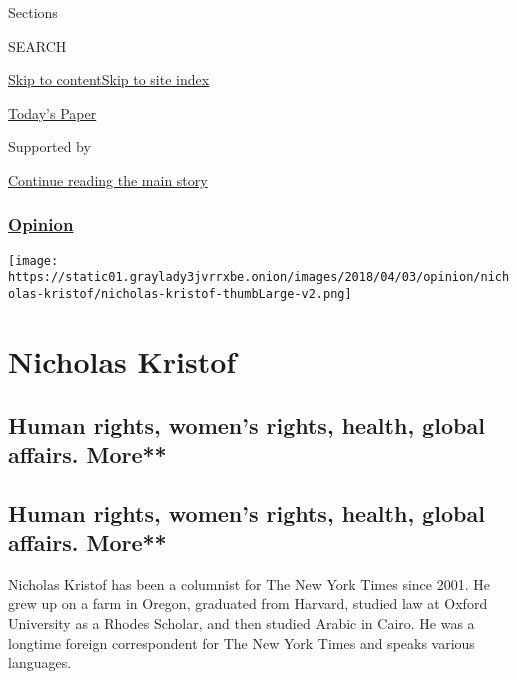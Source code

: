 Sections

SEARCH

\protect\hyperlink{site-content}{Skip to
content}\protect\hyperlink{site-index}{Skip to site index}

\href{https://myaccount.nytimes3xbfgragh.onion/auth/login?response_type=cookie\&client_id=vi}{}

\href{https://www.nytimes3xbfgragh.onion/section/todayspaper}{Today's
Paper}

Supported by

\protect\hyperlink{after-sponsor}{Continue reading the main story}

\hypertarget{opinion}{%
\subsubsection{\texorpdfstring{\href{/section/opinion}{Opinion}}{Opinion}}\label{opinion}}

\texttt{[image: https://static01.graylady3jvrrxbe.onion/images/2018/04/03/opinion/nicholas-kristof/nicholas-kristof-thumbLarge-v2.png]}

\hypertarget{nicholas-kristof}{%
\section{Nicholas Kristof}\label{nicholas-kristof}}

\hypertarget{human-rights-womens-rights-health-global-affairs-more}{%
\subsection{Human rights, women's rights, health, global affairs.
More**}\label{human-rights-womens-rights-health-global-affairs-more}}

\hypertarget{human-rights-womens-rights-health-global-affairs-more-1}{%
\subsection{Human rights, women's rights, health, global affairs.
More**}\label{human-rights-womens-rights-health-global-affairs-more-1}}

Nicholas Kristof has been a columnist for The New York Times since 2001.
He grew up on a farm in Oregon, graduated from Harvard, studied law at
Oxford University as a Rhodes Scholar, and then studied Arabic in Cairo.
He was a longtime foreign correspondent for The New York Times and
speaks various languages.

